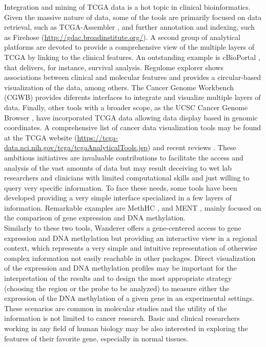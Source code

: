 \documentclass{bmcart}
\begin{document}
Integration and mining of TCGA data is a hot topic in clinical bioinformatics. Given the massive nature of data, some of the tools are primarily focused on data retrieval, such as TCGA-Assembler \cite{zhu2014tcga}, and further annotation and indexing, such as Firehose  (\url{http://gdac.broadinstitute.org/}). A second group of analytical platforms are devoted to provide a comprehensive view of the multiple layers of TCGA by linking to the clinical features. An outstanding example is cBioPortal \cite{gao2013integrative}, that delivers, for instance, survival analysis. Regulome explorer \cite{cancer2012comprehensive} shows associations between clinical and molecular features and provides a circular-based visualization of the data, among others. The Cancer Genome Workbench (CGWB) \cite{zhang2010cancer} provides diferents interfaces to integrate and visualize multiple layers of data. Finally, other tools with a broader scope, as the UCSC Cancer Genome Browser \cite{kent2002human}, have incorporated TCGA data allowing data display based in genomic coordinates. A comprehensive list of cancer data visualization tools may be found at the TCGA website (\url{https://tcga-data.nci.nih.gov/tcga/tcgaAnalyticalTools.jsp}) and recent reviews \cite{plass2013mutations,schroeder2013visualizing}. These ambitious initiatives are invaluable contributions to facilitate the access and analysis of the vast amounts of data but may result deceiving to wet lab researchers and clinicians with limited computational skills and just willing to query very specific information. To face these needs, some tools have been developed providing a very simple interface specialized in a few layers of information. Remarkable examples are MethHC \cite{huang2014methhc}, and MENT \cite{baek2013ment}, mainly focused on the comparison of gene expression and DNA methylation.\\ 

Similarly to these two tools, Wanderer offers a gene-centered access to gene expression and DNA methylation but providing an interactive view in a regional context, which represents a very simple and intuitive representation of otherwise complex information not easily reachable in other packages. Direct visualization of the expression and DNA methylation profiles may be important for the interpretation of the results and to design the most appropriate strategy (choosing the region or the probe to be analyzed) to measure either the expression of the DNA methylation of a given gene in an experimental settings. These scenarios are common in molecular studies and the utility of the information is not limited to cancer research. Basic and clinical researchers working in any field of human biology may be also interested in exploring the features of their favorite gene, especially in normal tissues.\\
\end{document}
